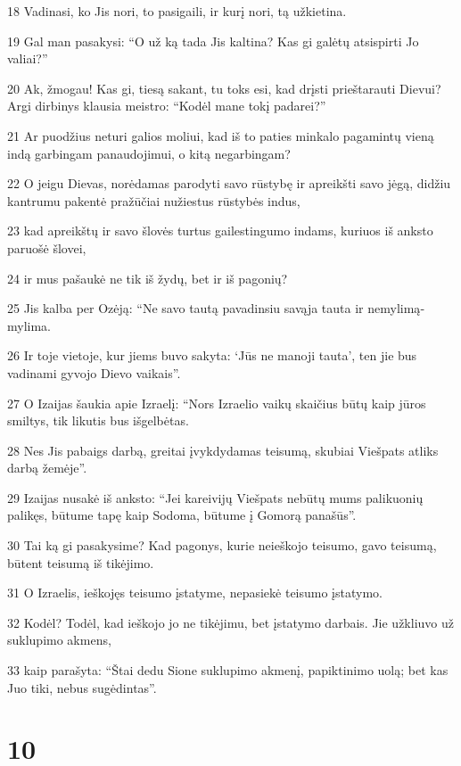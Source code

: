 \par 18 Vadinasi, ko Jis nori, to pasigaili, ir kurį nori, tą užkietina. 
\par 19 Gal man pasakysi: “O už ką tada Jis kaltina? Kas gi galėtų atsispirti Jo valiai?” 
\par 20 Ak, žmogau! Kas gi, tiesą sakant, tu toks esi, kad drįsti prieštarauti Dievui? Argi dirbinys klausia meistro: “Kodėl mane tokį padarei?” 
\par 21 Ar puodžius neturi galios moliui, kad iš to paties minkalo pagamintų vieną indą garbingam panaudojimui, o kitą negarbingam? 
\par 22 O jeigu Dievas, norėdamas parodyti savo rūstybę ir apreikšti savo jėgą, didžiu kantrumu pakentė pražūčiai nužiestus rūstybės indus, 
\par 23 kad apreikštų ir savo šlovės turtus gailestingumo indams, kuriuos iš anksto paruošė šlovei,­ 
\par 24 ir mus pašaukė ne tik iš žydų, bet ir iš pagonių? 
\par 25 Jis kalba per Ozėją: “Ne savo tautą pavadinsiu savąja tauta ir nemylimą­mylima. 
\par 26 Ir toje vietoje, kur jiems buvo sakyta: ‘Jūs ne manoji tauta’, ten jie bus vadinami gyvojo Dievo vaikais”. 
\par 27 O Izaijas šaukia apie Izraelį: “Nors Izraelio vaikų skaičius būtų kaip jūros smiltys, tik likutis bus išgelbėtas. 
\par 28 Nes Jis pabaigs darbą, greitai įvykdydamas teisumą, skubiai Viešpats atliks darbą žemėje”. 
\par 29 Izaijas nusakė iš anksto: “Jei kareivijų Viešpats nebūtų mums palikuonių palikęs, būtume tapę kaip Sodoma, būtume į Gomorą panašūs”. 
\par 30 Tai ką gi pasakysime? Kad pagonys, kurie neieškojo teisumo, gavo teisumą, būtent teisumą iš tikėjimo. 
\par 31 O Izraelis, ieškojęs teisumo įstatyme, nepasiekė teisumo įstatymo. 
\par 32 Kodėl? Todėl, kad ieškojo jo ne tikėjimu, bet įstatymo darbais. Jie užkliuvo už suklupimo akmens, 
\par 33 kaip parašyta: “Štai dedu Sione suklupimo akmenį, papiktinimo uolą; bet kas Juo tiki, nebus sugėdintas”.


\chapter{10}


